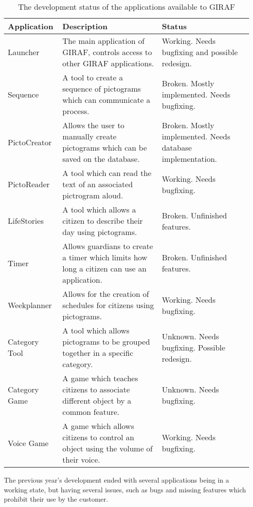 \begin{table}[H]
\centering
\begin{tabular}{|p{2.7cm}|p{6cm}|p{5cm}|}
\hline
Application			& Description & Status \\\hline
Launcher  			& The main application of GIRAF, controls access to other GIRAF
applications. & Working. Needs bugfixing and possible redesign. \\\hline
Sequence & A tool to create a sequence of pictograms which can communicate a
process. & Broken. Mostly implemented. Needs bugfixing.\\\hline 
PictoCreator  	   	& Allows the user to
manually create pictograms which can be saved on the database. & Broken. Mostly
implemented. Needs database implementation.\\\hline 
PictoReader	   		& A tool
which can read the text of an associated pictrogram aloud. & Working.
Needs bugfixing.\\\hline 
LifeStories	   		& A tool which allows a citizen to
describe their day using pictograms. & Broken. Unfinished features. \\\hline 
Timer     	   		& Allows guardians to create a timer which
limits how long a citizen can use an application. & Broken. Unfinished
features.\\\hline 
Weekplanner 		& Allows for the creation of schedules for citizens
using pictograms. & Working. Needs bugfixing.\\\hline 
Category Tool		& A tool which allows pictograms to be grouped together
in a specific category. & Unknown. Needs bugfixing. Possible redesign.\\\hline 
Category Game   	& A game which teaches citizens to associate
different object by a common feature. & Unknown. Needs bugfixing.\\\hline 
Voice Game  		& A game which allows citizens to control an object
using the volume of their voice. & Working. Needs bugfixing.\\\hline
\end{tabular} 
\caption{The development status of the applications available to GIRAF}
\label{GApps}
\end{table}

The previous year's development ended with several applications being in a
working state, but having several issues, such as bugs and missing features
which prohibit their use by the customer.

